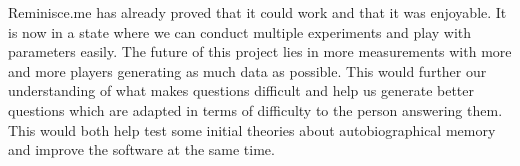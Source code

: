 Reminisce.me has already proved that it could work and that it was enjoyable. It is now in a state where we can conduct multiple experiments and play with parameters easily. The future of this project lies in more measurements with more and more players generating as much data as possible. This would further our understanding of what makes questions difficult and help us generate better questions which are adapted in terms of difficulty to the person answering them. This would both help test some initial theories about autobiographical memory and improve the software at the same time.